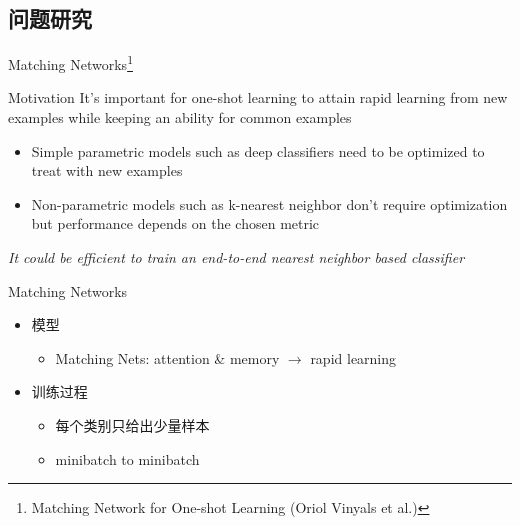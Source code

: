 \documentclass[10pt]{beamer}
\begin{document}
\subsection{问题研究}
\begin{frame}{Matching Networks\footnote{Matching Network for One-shot Learning (Oriol Vinyals et al.)}}
\begin{block}{Motivation}
It's important for one-shot learning to attain rapid learning from new examples while keeping an ability for common examples
\end{block}
\begin{itemize}
	\item Simple parametric models such as deep classifiers need to be optimized to treat with new examples
	\item Non-parametric models such as k-nearest neighbor don't require optimization but performance depends on the chosen metric
	\end{itemize}
\begin{block}{}
\textit{It could be efficient to train an end-to-end nearest neighbor based classifier}
\end{block}


\end{frame}




\begin{frame}{Matching Networks}
\begin{itemize}
	\item 模型
	\begin{itemize}
		\item Matching Nets: attention \& memory $\rightarrow$ rapid learning
	\end{itemize}
	\bigskip
	\item 训练过程
	\begin{itemize}
		\item 每个类别只给出少量样本
		\item minibatch to minibatch
	\end{itemize}
\end{itemize}
\end{frame}
\end{document}
